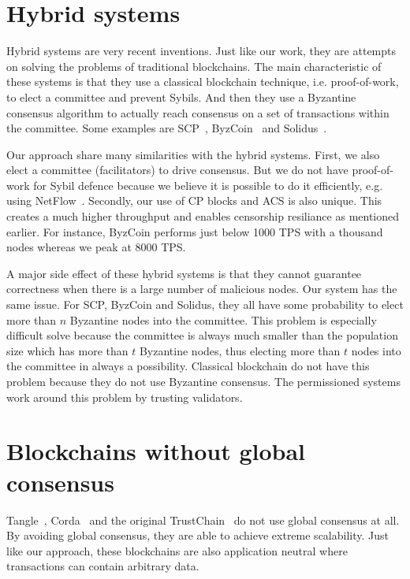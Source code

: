 \section{Hybrid systems}
Hybrid systems are very recent inventions.
Just like our work, they are attempts on solving the problems of traditional blockchains.
The main characteristic of these systems is that they use a classical blockchain technique,
i.e. proof-of-work, to elect a committee and prevent Sybils.
And then they use a Byzantine consensus algorithm to actually reach consensus on a set of transactions within the committee.
Some examples are SCP~\cite{luu2015scp}, ByzCoin~\cite{kogias2016enhancing} and Solidus~\cite{abraham2016solidus}.

Our approach share many similarities with the hybrid systems.
First, we also elect a committee (facilitators) to drive consensus.
But we do not have proof-of-work for Sybil defence because we believe 
it is possible to do it efficiently, e.g. using NetFlow~\cite{pimotte}.
Secondly, our use of CP blocks and ACS is also unique.
This creates a much higher throughput and enables censorship resiliance as mentioned earlier.
For instance, ByzCoin performs just below 1000 TPS with a thousand nodes whereas we peak at 8000 TPS.

A major side effect of these hybrid systems is that they cannot guarantee correctness when there is a large number of malicious nodes.
Our system has the same issue.
For SCP, ByzCoin and Solidus, they all have some probability to elect more than $n$ Byzantine nodes into the committee.
This problem is especially difficult solve because the committee is always much smaller than the population size which has more than $t$ Byzantine nodes,
thus electing more than $t$ nodes into the committee in always a possibility.
Classical blockchain do not have this problem because they do not use Byzantine consensus.
The permissioned systems work around this problem by trusting validators.

\section{Blockchains without global consensus}

Tangle~\cite{tangle}, Corda~\cite{corda} and the original TrustChain~\cite{multichain} do not use global consensus at all.
By avoiding global consensus, they are able to achieve extreme scalability.
Just like our approach, these blockchains are also application neutral where transactions can contain arbitrary data.

